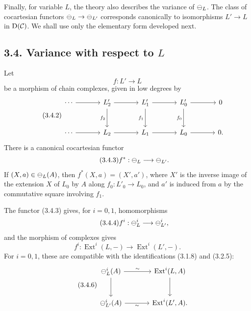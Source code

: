 \documentclass[11pt]{article}
\providecommand{\Ext}{\operatorname{Ext}}
\begin{document}
Finally, for variable \(L\), the theory also describes the variance of \(\mathcal\Psi_L\).  The class of cocartesian functors \(\mathcal\Psi_L\to\mathcal\Psi_{L'}\) corresponds canonically to isomorphisms \(L'\to L\) in \(\mathrm D(\mathcal C)\).  We shall use only the elementary form developed next.

\subsection*{3.4. Variance with respect to \(L\)}
Let
\begin{equation}\tag{3.4.1}
  f:L'\longrightarrow L
\end{equation}
be a morphism of chain complexes, given in low degrees by
\begin{equation}\tag{3.4.2}
\begin{tikzcd}[column sep=large,row sep=large]
\cdots\arrow[r]&L'_2\arrow[r]\arrow[d,"f_2"']&L'_1\arrow[r]\arrow[d,"f_1"']&L'_0\arrow[r]\arrow[d,"f_0"']&0\\
\cdots\arrow[r]&L_2\arrow[r]&L_1\arrow[r]&L_0\arrow[r]&0.
\end{tikzcd}
\end{equation}
There is a canonical cocartesian functor
\begin{equation}\tag{3.4.3}
  f^*:\mathcal\Psi_L\longrightarrow\mathcal\Psi_{L'}.
\end{equation}
If \((X,a)\in\mathcal\Psi_L(A)\), then \(f^*(X,a)=(X',a')\), where \(X'\) is the inverse image of the extension \(X\) of \(L_0\) by \(A\) along \(f_0:L'_0\to L_0\), and \(a'\) is induced from \(a\) by the commutative square involving \(f_1\).

The functor (3.4.3) gives, for \(i=0,1\), homomorphisms
\begin{equation}\tag{3.4.4}
  f^i:\mathcal\Psi_L^i\longrightarrow\mathcal\Psi_{L'}^i,
\end{equation}
and the morphism of complexes gives
\begin{equation}\tag{3.4.5}
  f^i:\Ext^i(L,-)\longrightarrow\Ext^i(L',-).
\end{equation}
For \(i=0,1\), these are compatible with the identifications (3.1.8) and (3.2.5):
\begin{equation}\tag{3.4.6}
\begin{tikzcd}[column sep=large,row sep=large]
\cPsi_L^i(A)\arrow[r,"\sim"]\arrow[d]&\Ext^i(L,A)\arrow[d]\\
\cPsi_{L'}^i(A)\arrow[r,"\sim"']&\Ext^i(L',A).
\end{tikzcd}
\end{equation}
\end{document}
